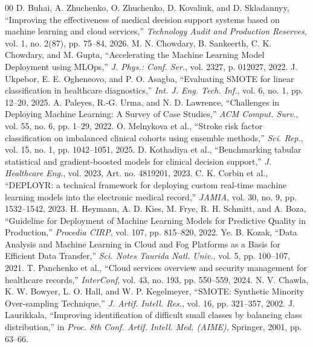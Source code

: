 \documentclass[10pt,journal,compsoc]{IEEEtran}
\begin{document}
\begin{thebibliography}{00}
 D. Buhai, A. Zhuchenko, O. Zhuchenko, D. Kovaliuk, and D. Skladannyy, ``Improving the effectiveness of medical decision support systems based on machine learning and cloud services,'' \textit{Technology Audit and Production Reserves}, vol. 1, no. 2(87), pp. 75--84, 2026.
 M. N. Chowdary, B. Sankeerth, C. K. Chowdary, and M. Gupta, ``Accelerating the Machine Learning Model Deployment using MLOps,'' \textit{J. Phys.: Conf. Ser.}, vol. 2327, p. 012027, 2022.
 J. Ukpebor, E. E. Ogheneovo, and P. O. Asagba, ``Evaluating SMOTE for linear classification in healthcare diagnostics,'' \textit{Int. J. Eng. Tech. Inf.}, vol. 6, no. 1, pp. 12--20, 2025.
 A. Paleyes, R.-G. Urma, and N. D. Lawrence, ``Challenges in Deploying Machine Learning: A Survey of Case Studies,'' \textit{ACM Comput. Surv.}, vol. 55, no. 6, pp. 1--29, 2022.
 O. Melnykova et al., ``Stroke risk factor classification on imbalanced clinical cohorts using ensemble methods,'' \textit{Sci. Rep.}, vol. 15, no. 1, pp. 1042--1051, 2025.
 D. Kothadiya et al., ``Benchmarking tabular statistical and gradient-boosted models for clinical decision support,'' \textit{J. Healthcare Eng.}, vol. 2023, Art. no. 4819201, 2023.
 C. K. Corbin et al., ``DEPLOYR: a technical framework for deploying custom real-time machine learning models into the electronic medical record,'' \textit{JAMIA}, vol. 30, no. 9, pp. 1532--1542, 2023.
 H. Heymann, A. D. Kies, M. Frye, R. H. Schmitt, and A. Boza, ``Guideline for Deployment of Machine Learning Models for Predictive Quality in Production,'' \textit{Procedia CIRP}, vol. 107, pp. 815--820, 2022.
 Ye. B. Kozak, ``Data Analysis and Machine Learning in Cloud and Fog Platforms as a Basis for Efficient Data Transfer,'' \textit{Sci. Notes Taurida Natl. Univ.}, vol. 5, pp. 100--107, 2021.
 T. Panchenko et al., ``Cloud services overview and security management for healthcare records,'' \textit{InterConf}, vol. 43, no. 193, pp. 550--559, 2024.
 N. V. Chawla, K. W. Bowyer, L. O. Hall, and W. P. Kegelmeyer, ``SMOTE: Synthetic Minority Over-sampling Technique,'' \textit{J. Artif. Intell. Res.}, vol. 16, pp. 321--357, 2002.
 J. Laurikkala, ``Improving identification of difficult small classes by balancing class distribution,'' in \textit{Proc. 8th Conf. Artif. Intell. Med. (AIME)}, Springer, 2001, pp. 63--66.

\end{thebibliography}
\end{document}
